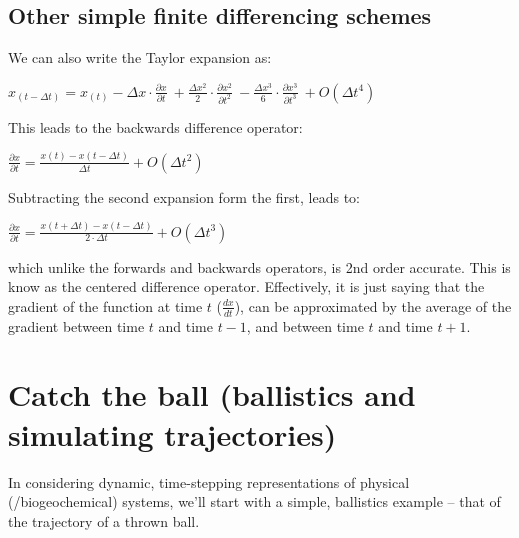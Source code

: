 \documentclass{tufte-book} %
\begin{document}

\subsection*{Other simple finite differencing schemes}

We can also write the Taylor expansion as:

\vspace{2mm}\(
x_{(t-\Delta t)}=x_{(t)} - \Delta x\cdot\frac{\partial x}{\partial t}\ + \frac{\Delta x^{2}}{2}\cdot\frac{\partial x^{2}}{\partial t^{2}}\ - \frac{\Delta x^{3}}{6}\cdot\frac{\partial x^{3}}{\partial t^{3}}\ + O(\Delta t^{4})
\)\vspace{2mm}

\noindent This leads to the backwards difference operator:

\vspace{2mm}\(
\frac{\partial x}{\partial t} = \frac{x(t)-x(t-\Delta t)}{\Delta t} + O(\Delta t^{2})
\)\vspace{2mm}

\noindent Subtracting the second expansion form the first, leads to:

\vspace{2mm}\(
\frac{\partial x}{\partial t} = \frac{x(t+\Delta t)-x(t-\Delta t)}{2\cdot\Delta t} + O(\Delta t^{3})
\)\vspace{2mm}

\noindent which unlike the forwards and backwards operators, is 2nd order accurate. This is know as the centered difference operator. Effectively, it is just saying that the gradient of the function at time \(t\) (\(\frac{dx}{dt}\)), can be approximated by the average of the gradient between time \(t\) and time \(t-1\), and between  time \(t\) and time \(t+1\).


\newpage


\section{Catch the ball (ballistics and simulating trajectories)}

In considering dynamic, time-stepping representations of physical (/biogeochemical) systems, we'll start with a simple, ballistics example -- that of the trajectory of a thrown ball.
\end{document}
